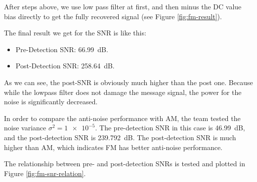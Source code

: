 \documentclass[../ECE459FinalProjectReport.tex]{subfiles}
\begin{document}
After steps above, we use low pass filter at first, and then minus the DC value bias directly to get the fully recovered signal (see Figure \ref{fig:fm-result}).

The final result we get for the SNR is like this:
\begin{itemize}
    \item Pre-Detection SNR: \SI{66.99}{dB}.
    \item Post-Detection SNR: \SI{258.64}{dB}.
\end{itemize}
As we can see, the post-SNR is obviously much higher than the post one. Because while the lowpass filter does not damage the message signal, the power for the noise is significantly decreased.

In order to compare the anti-noise performance with AM, the team tested the noise variance $\sigma^2 = \num{1e-5}$. The pre-detection SNR in this case is \SI{46.99}{dB}, and the post-detection SNR is \SI{239.792}{dB}. The post-detection SNR is much higher than AM, which indicates FM has better anti-noise performance.

The relationship between pre- and post-detection SNRs is tested and plotted in Figure \ref{fig:fm-snr-relation}.
\end{document}
